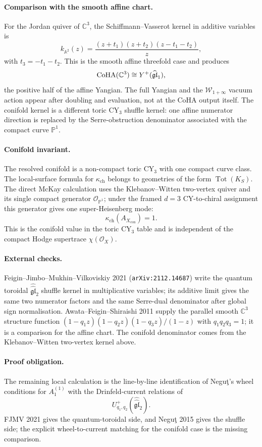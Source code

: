 \paragraph{Comparison with the smooth affine chart.}
For the Jordan quiver of $\mathbb C^3$, the Schiffmann--Vasserot kernel
in additive variables is
\[
  k_{\mathbb A^2}(z)
  =
  \frac{(z+t_1)(z+t_2)(z-t_1-t_2)}{z},
\]
with $t_3=-t_1-t_2$.  This is the smooth affine threefold case and
produces
\[
  \mathrm{CoHA}(\mathbb C^3)\cong Y^+(\widehat{\mathfrak{gl}}_1),
\]
the positive half of the affine Yangian.  The full Yangian and the
$\mathcal W_{1+\infty}$ vacuum action appear after doubling and
evaluation, not at the CoHA output itself.  The conifold kernel is a
different toric CY$_3$ shuffle kernel: one affine numerator direction is
replaced by the Serre-obstruction denominator associated with the compact
curve $\mathbb P^1$.

\paragraph{Conifold invariant.}
The resolved conifold is a non-compact toric CY$_3$ with one compact
curve class.  The local-surface formula for
$\kappa_{\mathrm{ch}}$ belongs to geometries of the form
\(\operatorname{Tot}(K_S)\).  The direct McKay calculation
uses the Klebanov--Witten two-vertex quiver and its single compact
generator $\mathcal O_{\mathbb P^1}$; under the framed $d=3$
CY-to-chiral assignment this generator gives one super-Heisenberg mode:
\[
  \kappa_{\mathrm{ch}}(A_{X_{\mathrm{con}}})=1.
\]
This is the conifold value in the toric CY$_3$ table and is independent
of the compact Hodge supertrace $\chi(\mathcal O_X)$.

\paragraph{External checks.}
Feigin--Jimbo--Mukhin--Vilkoviskiy 2021
(\texttt{arXiv:2112.14687}) write the quantum toroidal
$\widehat{\widehat{\mathfrak{gl}}}_2$ shuffle kernel in multiplicative
variables; its additive limit gives the same two numerator factors and
the same Serre-dual denominator after global sign normalisation.
Awata--Feigin--Shiraishi 2011 supply the parallel smooth
$\mathbb C^3$ structure function
$(1-q_1z)(1-q_2z)(1-q_3z)/(1-z)$ with $q_1q_2q_3=1$; it is a comparison
for the affine chart. The conifold denominator comes from the
Klebanov--Witten two-vertex kernel above.

\paragraph{Proof obligation.}
The remaining local calculation is the line-by-line identification of
Negu\c{t}'s wheel conditions for $A_1^{(1)}$ with the Drinfeld-current
relations of
\[
  U^+_{q_1,q_2}(\widehat{\widehat{\mathfrak{gl}}}_2).
\]
FJMV 2021 gives the quantum-toroidal side, and Negu\c{t} 2015 gives the
shuffle side; the explicit wheel-to-current matching for the conifold
case is the missing comparison.
